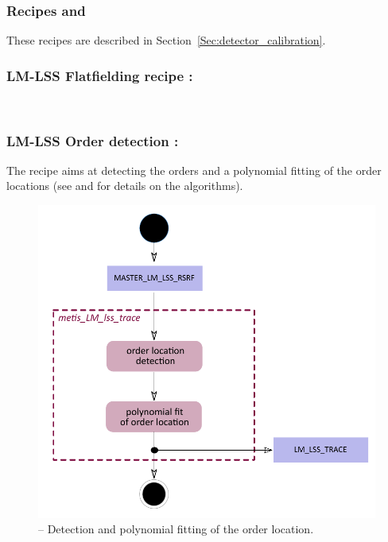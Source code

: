 \subsubsection{Recipes  and }
These recipes are described in Section~\ref{Sec:detector_calibration}.

\subsubsection{LM-LSS Flatfielding recipe :}\label{rec:lsslmflat}
\\

\clearpage
\subsubsection{LM-LSS Order detection :}\label{rec:lsslmtrace}
The recipe aims at detecting the orders and a polynomial fitting of the order locations (see \cite{pis02} and \cite{pis21} for details on the algorithms).

\begin{figure}[ht]
  \centering
  \includegraphics[width=0.5\textheight]{figures/metis_lm_lss_trace_v0.70.pdf}
  \caption[Recipe: ]{ --
    Detection and polynomial fitting of the order location.}
  \label{Fig:rec_lm_lss_wave}
\end{figure}

